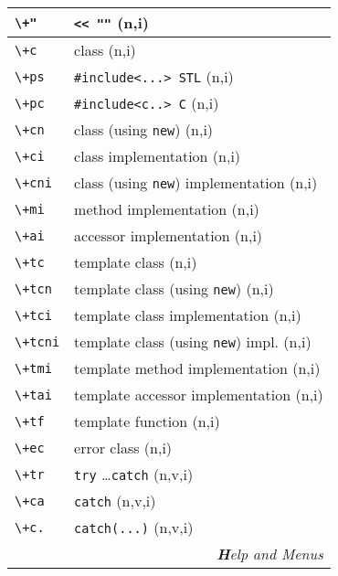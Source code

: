 \documentclass[oneside,11pt,landscape,DIV17]{scrartcl}
\begin{document}
\begin{multicols}{3}
\begin{center}
\begin{tabular}[]{|p{12mm}|p{60mm}|}
\hline \verb'\+"'   & \verb'<< ""'                \hfill (n,i)\\
\hline \verb'\+c'   & class                                   \hfill (n,i)\\
\hline \verb'\+ps'  & \verb$#include<...> STL$                \hfill (n,i)\\
\hline \verb'\+pc'  & \verb$#include<c..> C$                  \hfill (n,i)\\
\hline \verb'\+cn'  & class (using \verb'new')                \hfill (n,i)\\
\hline \verb'\+ci'  & class  implementation                   \hfill (n,i)\\
\hline \verb'\+cni' & class (using \verb'new') implementation \hfill (n,i)\\
\hline \verb'\+mi'  & method implementation                   \hfill (n,i)\\
\hline \verb'\+ai'  & accessor implementation                 \hfill (n,i)\\
\hline \verb'\+tc'  & template class                          \hfill (n,i)\\
\hline \verb'\+tcn' & template class (using \verb'new')       \hfill (n,i)\\
\hline \verb'\+tci' & template class  implementation          \hfill (n,i)\\
\hline \verb'\+tcni'& template class (using \verb'new') impl. \hfill (n,i)\\
\hline \verb'\+tmi' & template method implementation          \hfill (n,i)\\
\hline \verb'\+tai' & template accessor implementation        \hfill (n,i)\\
\hline \verb'\+tf'  & template function                       \hfill (n,i)\\
\hline \verb'\+ec'  & error class                             \hfill (n,i)\\
\hline \verb'\+tr'  & \verb'try' \dots \verb'catch'           \hfill (n,v,i)\\
\hline \verb'\+ca'  & \verb'catch'                            \hfill (n,v,i)\\
\hline \verb'\+c.'  & \verb'catch(...)'                       \hfill (n,v,i)\\
\hline 
\hline 
\multicolumn{2}{|r|}{\textsl{\textbf{H}elp and Menus}}\\

\end{tabular}
\end{center}
\end{multicols}
\end{document}
